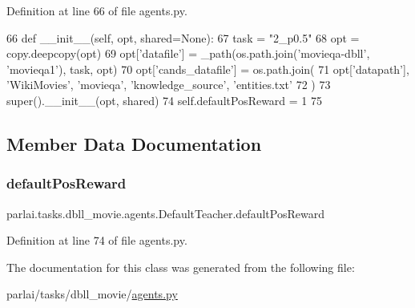 Definition at line 66 of file agents.\+py.


\begin{DoxyCode}
66     \textcolor{keyword}{def }\_\_init\_\_(self, opt, shared=None):
67         task = \textcolor{stringliteral}{"2\_p0.5"}
68         opt = copy.deepcopy(opt)
69         opt[\textcolor{stringliteral}{'datafile'}] = \_path(os.path.join(\textcolor{stringliteral}{'movieqa-dbll'}, \textcolor{stringliteral}{'movieqa1'}), task, opt)
70         opt[\textcolor{stringliteral}{'cands\_datafile'}] = os.path.join(
71             opt[\textcolor{stringliteral}{'datapath'}], \textcolor{stringliteral}{'WikiMovies'}, \textcolor{stringliteral}{'movieqa'}, \textcolor{stringliteral}{'knowledge\_source'}, \textcolor{stringliteral}{'entities.txt'}
72         )
73         super().\_\_init\_\_(opt, shared)
74         self.defaultPosReward = 1
75 \end{DoxyCode}


\subsection{Member Data Documentation}
\mbox{\label{classparlai_1_1tasks_1_1dbll__movie_1_1agents_1_1DefaultTeacher_a8349f6694fcf25ac83d5f0972d99fede}} 
\subsubsection{\texorpdfstring{default\+Pos\+Reward}{defaultPosReward}}
{\footnotesize\ttfamily parlai.\+tasks.\+dbll\+\_\+movie.\+agents.\+Default\+Teacher.\+default\+Pos\+Reward}



Definition at line 74 of file agents.\+py.



The documentation for this class was generated from the following file\+:\begin{DoxyCompactItemize}
\item 
parlai/tasks/dbll\+\_\+movie/\hyperlink{parlai_2tasks_2dbll__movie_2agents_8py}{agents.\+py}\end{DoxyCompactItemize}
